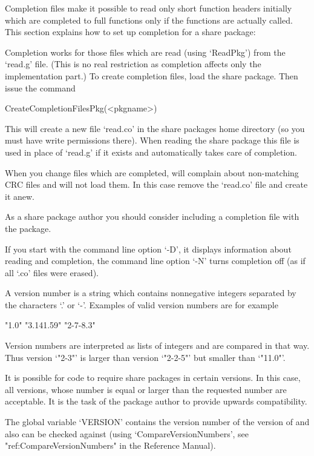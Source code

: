 Completion files make it possible to read only short function headers
initially which are completed to full functions only if the functions are
actually called.  This section explains how to set up completion for a share
package:

Completion works for those files which are read (using `ReadPkg')
from the `read.g' file. (This is no real restriction as completion affects
only the implementation part.) To create completion files, load the share
package. Then issue the command

\>CreateCompletionFilesPkg(<pkgname>)

This will create a new file `read.co' in the share packages home directory
(so you must have write permissions there). When reading the share package
this file is used in place of `read.g' if it exists and automatically takes
care of completion.

When you change files which are completed, {\GAP} will complain about
non-matching CRC files and will not load them. In this case remove
the `read.co' file and create it anew.

As a share package author you should consider including a completion file
with the package.

If you start {\GAP} with the command line option `-D', it displays
information about reading and completion, the command line option `-N' turns
completion off (as if all `.co' files were erased).


A version number is a string which contains nonnegative integers separated
by the characters `.' or `-'. Examples of valid version numbers are for
example

\begintt
"1.0"   "3.141.59"  "2-7-8.3"
\endtt

Version numbers are interpreted as lists of integers and are compared in
that way. Thus version `"2-3"' is larger than version `"2-2-5"' but smaller
than `"11.0"'.

It is possible for code to require share packages in certain versions. In
this case, all versions, whose number is equal or larger than the requested
number are acceptable. It is the task of the package author to provide
upwards compatibility.

The global variable `VERSION' contains the version number of the version of
{\GAP} and also can be checked against (using `CompareVersionNumbers', see
"ref:CompareVersionNumbers" in the Reference Manual).


